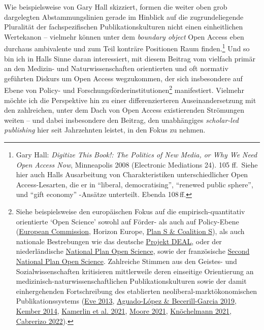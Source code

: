 \documentclass[a4paper,
fontsize=11pt,
oneside,
numbers=noperiodatend,
parskip=half-,
bibliography=totoc,
final
]{scrartcl}
\begin{document}
Wie beispielsweise von Gary Hall skizziert, formen die weiter oben grob
dargelegten Abstammungslinien gerade im Hinblick auf die
zugrundeliegende Pluralität der fachspezifischen Publikationskulturen
nicht einen einheitlichen Wertekanon -- vielmehr können unter dem
\emph{boundary object} Open Access eben durchaus ambivalente und zum
Teil konträre Positionen Raum finden.\footnote{Gary Hall: \emph{Digitize
  This Book!: The Politics of New Media, or Why We Need Open Access
  Now}, Minneapolis 2008 (Electronic Mediations 24). 105\,\,ff.~Siehe
  hier auch Halls Ausarbeitung von Charakteristiken unterschiedlicher
  Open Access-Lesarten, die er in \enquote{liberal, democratising},
  \enquote{renewed public sphere}, und \enquote{gift economy} -Ansätze
  unterteilt. Ebenda 108\,ff.} Und so bin ich in Halls Sinne daran
interessiert, mit diesem Beitrag vom vielfach primär an den Medizin- und
Naturwissenschaften orientierten und oft normativ geführten Diskurs um
Open Access wegzukommen, der sich insbesondere auf Ebene von Policy- und
Forschungsförderinstitutionen\footnote{Siehe beispielsweise den
  europäischen Fokus auf die empirisch-quantitativ orientierte
  \enquote*{Open Science} sowohl auf Förder- als auch auf Policy-Ebene
  (\href{https://ec.europa.eu/info/research-and-innovation/strategy/strategy-2020-2024/our-digital-future/open-science_en}{European
  Commission}, Horizon Europe, \href{https://www.coalition-s.org/}{Plan
  S \& Coalition S}), als auch nationale Bestrebungen wie das deutsche
  \href{https://www.projekt-deal.de/}{Projekt DEAL}, oder der
  niederländische \href{https://www.openscience.nl/en}{National Plan
  Open Science}, sowie der französische
  \href{https://www.ouvrirlascience.fr/second-national-plan-for-open-science/}{Second
  National Plan Open Science}. Zahlreiche Stimmen aus den Geistes- und
  Sozialwissenschaften kritisieren mittlerweile deren einseitige
  Orientierung an medizinisch-naturwissenschaftlichen
  Publikationskulturen sowie der damit einhergehenden Fortschreibung des
  etablierten neoliberal-marktökonomischen Publikationssystems
  (\href{https://eve.gd/2013/03/10/open-access-neoliberalism-impact-and-the-privatisation-of-knowledge/}{Eve
  2013},
  \href{https://blogs.lse.ac.uk/impactofsocialsciences/2019/08/08/amelica-before-plan-s-the-latin-american-initiative-to-develop-a-cooperative-non-commercial-academic-led-system-of-scholarly-communication/}{Aguado-López
  \& Becerill-Garcia 2019},
  \href{https://adanewmedia.org/2014/04/issue4-kember/}{Kember 2014},
  \href{https://doi.org/10.1111/dech.12635}{Kamerlin et al. 2021},
  \href{https://doi.org/10.1111/dech.12640}{Moore 2021},
  \href{https://osf.io/hw7at}{Knöchelmann 2021},
  \href{https://www.nature.com/articles/d41586-022-01414-7}{Cabrerizo
  2022}).} manifestiert. Vielmehr möchte ich die Perspektive hin zu
einer differenzierteren Auseinandersetzung mit den zahlreichen, unter
dem Dach von Open Access existierenden Strömungen weiten -- und dabei
insbesondere den Beitrag, den unabhängiges \emph{scholar-led publishing}
hier seit Jahrzehnten leistet, in den Fokus zu nehmen.
\end{document}
